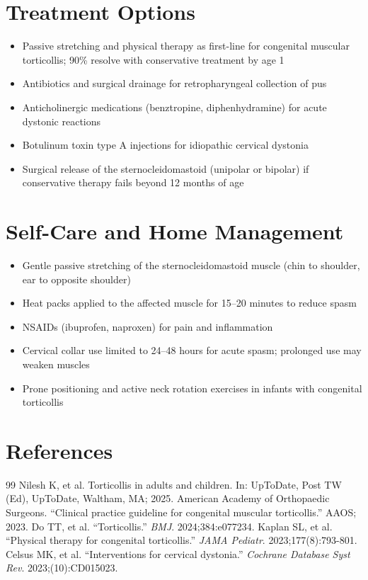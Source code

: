 \section*{Treatment Options}
\begin{itemize}
  \item Passive stretching and physical therapy as first-line for congenital muscular torticollis; 90\% resolve with conservative treatment by age 1
  \item Antibiotics and surgical drainage for retropharyngeal collection of pus
  \item Anticholinergic medications (benztropine, diphenhydramine) for acute dystonic reactions
  \item Botulinum toxin type A injections for idiopathic cervical dystonia
  \item Surgical release of the sternocleidomastoid (unipolar or bipolar) if conservative therapy fails beyond 12 months of age
\end{itemize}

\section*{Self-Care and Home Management}
\begin{itemize}
  \item Gentle passive stretching of the sternocleidomastoid muscle (chin to shoulder, ear to opposite shoulder)
  \item Heat packs applied to the affected muscle for 15--20 minutes to reduce spasm
  \item NSAIDs (ibuprofen, naproxen) for pain and inflammation
  \item Cervical collar use limited to 24--48 hours for acute spasm; prolonged use may weaken muscles
  \item Prone positioning and active neck rotation exercises in infants with congenital torticollis
\end{itemize}

\section*{References}
\begin{thebibliography}{99}
 Nilesh K, et al. Torticollis in adults and children. In: UpToDate, Post TW (Ed), UpToDate, Waltham, MA; 2025.
 American Academy of Orthopaedic Surgeons. ``Clinical practice guideline for congenital muscular torticollis.'' AAOS; 2023.
 Do TT, et al. ``Torticollis.'' \emph{BMJ}. 2024;384:e077234.
 Kaplan SL, et al. ``Physical therapy for congenital torticollis.'' \emph{JAMA Pediatr}. 2023;177(8):793-801.
 Celsus MK, et al. ``Interventions for cervical dystonia.'' \emph{Cochrane Database Syst Rev}. 2023;(10):CD015023.
\end{thebibliography}

